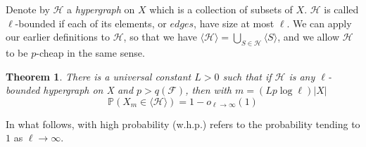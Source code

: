 \documentclass[12pt,oneside,reqno]{amsart}
\newtheorem{theorem}{Theorem}[section]
\theoremstyle{definition}
\numberwithin{equation}{theorem}
\newcommand{\PP}{{\mathbb P}}%
\newcommand{\cF}{{\mathcal F}}
\newcommand{\cH}{{\mathcal H}}
\begin{document}
Denote by $\cH$ a \emph{hypergraph} on $X$ which is a collection of subsets of $X$. $\cH$ is called $\ell$-bounded if each of its elements, or $edges$, have size at most $\ell$. We can apply our earlier definitions to $\cH$, so that we have $\langle \cH \rangle = \bigcup_{S \in \cH} {\langle S \rangle}$, and we allow $\cH$ to be $p$-cheap in the same sense. 

\begin{theorem}\label{reformulation}
There is a universal constant $L>0$ such that if $\cH$ is any $\ell$-bounded hypergraph on X and $p>q(\cF)$, then with $m = (Lp\log{\ell})|X|$
\begin{equation}\label{the}
\PP\left(X_{ m} \in \langle \cH \rangle \right) = 1-o_{\ell \rightarrow \infty}(1)
\end{equation}
\end{theorem}

In what follows, with high probability (w.h.p.) refers to the probability tending to $1$ as $\ell \rightarrow \infty$.
\newline 
\end{document}
